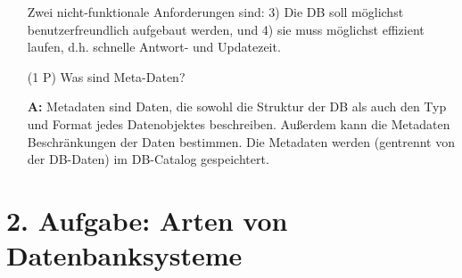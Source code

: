 \documentclass[12pt]{report}
\newcommand{\answer}{\textbf{A:}}
\begin{document}
\begin{enumerate}
  Zwei nicht-funktionale Anforderungen sind: 3) Die DB soll möglichst benutzerfreundlich aufgebaut werden, und 4) sie muss möglichst effizient laufen, d.h. schnelle Antwort- und Updatezeit.


\item[(1 P)] Was sind Meta-Daten?
\item[\answer]
  Metadaten sind Daten, die sowohl die Struktur der DB als auch den Typ und Format jedes Datenobjektes beschreiben. Außerdem kann die Metadaten Beschränkungen der Daten bestimmen. Die Metadaten werden (gentrennt von der DB-Daten) im DB-Catalog gespeichtert.


\end{enumerate}

\section*{2. Aufgabe: Arten von Datenbanksysteme}
\end{document}
